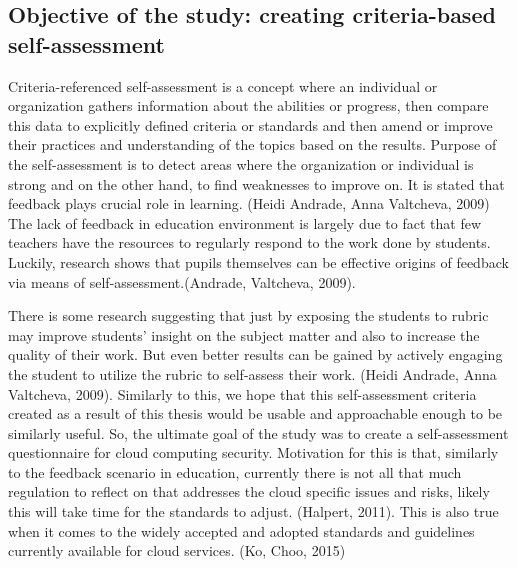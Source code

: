 \documentclass{article}
\begin{document}
\subsection{Objective of the study: creating criteria-based self-assessment}
Criteria-referenced self-assessment is a concept where an individual or organization gathers information about the abilities or progress, then compare this data to explicitly defined criteria or standards and then amend or improve their practices and understanding of the topics based on the results.
Purpose of the self-assessment is to detect areas where the organization or individual is strong and on the other hand, to find weaknesses to improve on. It is stated that feedback plays crucial role in learning. (Heidi Andrade, Anna Valtcheva, 2009)
The lack of feedback in education environment is largely due to fact that few teachers have the resources to regularly respond to the work done by students. Luckily, research shows that pupils themselves can be effective origins of feedback via means of self-assessment.(Andrade, Valtcheva, 2009).
\par
There is some research suggesting that just by exposing the students to rubric may improve students' insight on the subject matter and also to increase the quality of their work. But even better results can be gained by actively engaging the student to utilize the rubric to self-assess their work. (Heidi Andrade, Anna Valtcheva, 2009). Similarly to this, we hope that this self-assessment criteria created as a result of this thesis would be usable and approachable enough to be similarly useful. 
So, the ultimate goal of the study was to create a self-assessment questionnaire for cloud computing security. Motivation for this is that, similarly to the feedback scenario in education, currently there is not all that much regulation to reflect on that addresses the cloud specific issues and risks, likely this will take time for the standards to adjust. (Halpert, 2011). This is also true when it comes to the widely accepted and adopted standards and guidelines currently available for cloud services. (Ko, Choo, 2015)
\end{document}
